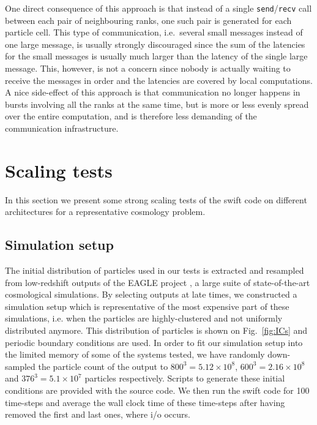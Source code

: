\documentclass{sig-alternate-05-2015}
\newcommand{\swift}{{\sc swift}\xspace}
\begin{document}
One direct consequence of this approach is that instead of a single
{\tt send}/{\tt recv} call between each pair of neighbouring ranks,
one such pair is generated for each particle cell.
This type of communication, i.e.~several small messages instead of
one large message, is usually strongly discouraged since the sum of
the latencies for the small messages is usually much larger than
the latency of the single large message.
This, however, is not a concern since nobody is actually waiting
to receive the messages in order and the latencies are covered
by local computations.
A nice side-effect of this approach is that communication no longer
happens in bursts involving all the ranks at the same time, but
is more or less evenly spread over the entire computation, and is
therefore less demanding of the communication infrastructure.




\section{Scaling tests}

In this section we present some strong scaling tests of the \swift code on different
architectures for a representative cosmology problem.

\subsection{Simulation setup}

The initial distribution of particles used in our tests is extracted and
resampled from low-redshift outputs of the EAGLE project \cite{Schaye2015}, a
large suite of state-of-the-art cosmological simulations. By selecting outputs
at late times, we constructed a simulation setup which is representative of the
most expensive part of these simulations, i.e. when the particles are
highly-clustered and not uniformly distributed anymore. This distribution of
particles is shown on Fig.~\ref{fig:ICs} and periodic boundary conditions are
used. In order to fit our simulation setup into the limited memory of some of
the systems tested, we have randomly down-sampled the particle count of the
output to $800^3=5.12\times10^8$, $600^3=2.16\times10^8$ and
$376^3=5.1\times10^7$ particles respectively. Scripts to generate these initial
conditions are provided with the source code. We then run the \swift code for
100 time-steps and average the wall clock time of these time-steps after having
removed the first and last ones, where i/o occurs.
\end{document}
